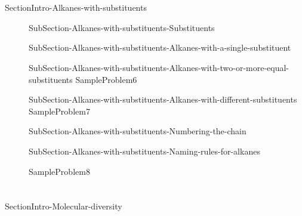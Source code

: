 \documentclass[main.tex]{subfiles}
\begin{document}
\section{\color{blue!30!black}{\faEnvira Alkanes with substituents}}
{SectionIntro-Alkanes-with-substituents}
\vspace{0.5cm}{Table-Substituents}
\sloppy\begin{description}
\item[]{SubSection-Alkanes-with-substituents-Substituents}
\item[]{SubSection-Alkanes-with-substituents-Alkanes-with-a-single-substituent}
\item[]{SubSection-Alkanes-with-substituents-Alkanes-with-two-or-more-equal-substituents}
{SampleProblem6}
\item[]{SubSection-Alkanes-with-substituents-Alkanes-with-different-substituents}
{SampleProblem7}
\item[]{SubSection-Alkanes-with-substituents-Numbering-the-chain}
\item[]{SubSection-Alkanes-with-substituents-Naming-rules-for-alkanes}

{SampleProblem8}
\end{description}






 \vspace{0.0cm}{Table-Functional-groups}

\section{\color{blue!30!black}{\faFlask Molecular diversity}}
 {SectionIntro-Molecular-diversity}
\end{document}

